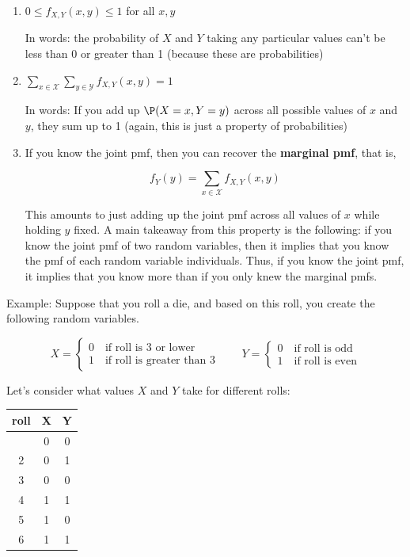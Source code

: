 \documentclass[
  letterpaper,
  DIV=11,
  numbers=noendperiod]{scrreprt}
\begin{document}
\begin{enumerate}
\def\labelenumi{\arabic{enumi}.}
\item
  \(0 \leq f_{X,Y}(x,y) \leq 1\) for all \(x,y\)

  In words: the probability of \(X\) and \(Y\) taking any particular
  values can't be less than 0 or greater than 1 (because these are
  probabilities)
\item
  \(\displaystyle \sum_{x \in \mathcal{X}} \sum_{y \in \mathcal{Y}} f_{X,Y}(x,y) = 1\)

  In words: If you add up \(\P(X=x, Y=y)\) across all possible values of
  \(x\) and \(y\), they sum up to 1 (again, this is just a property of
  probabilities)
\item
  If you know the joint pmf, then you can recover the \textbf{marginal
  pmf}, that is,

  \[
   f_Y(y) = \sum_{x \in \mathcal{X}} f_{X,Y}(x,y)
   \]

  This amounts to just adding up the joint pmf across all values of
  \(x\) while holding \(y\) fixed. A main takeaway from this property is
  the following: if you know the joint pmf of two random variables, then
  it implies that you know the pmf of each random variable individuals.
  Thus, if you know the joint pmf, it implies that you know more than if
  you only knew the marginal pmfs.
\end{enumerate}

{Example: }Suppose that you roll a die, and based on this roll, you
create the following random variables.

\[
  X = \begin{cases} 0 \quad \textrm{if roll is 3 or lower} \\
  1 \quad \textrm{if roll is greater than 3} \end{cases} \qquad Y = \begin{cases} 0 \quad \textrm{if roll is odd} \\
  1 \quad \textrm{if roll is even} \end{cases}
\]

Let's consider what values \(X\) and \(Y\) take for different rolls:

\begin{longtable}[]{@{}ccc@{}}
\toprule\noalign{}
\textbf{roll} & \textbf{X} & \textbf{Y} \\
\midrule\noalign{}
\endhead
\bottomrule\noalign{}
\endlastfoot
1 & 0 & 0 \\
2 & 0 & 1 \\
3 & 0 & 0 \\
4 & 1 & 1 \\
5 & 1 & 0 \\
6 & 1 & 1 \\
\end{longtable}
\end{document}
